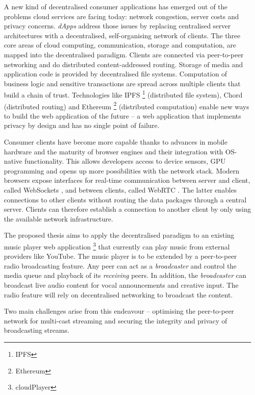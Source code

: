 A new kind of decentralised consumer applications has emerged out of the problems cloud services are facing today: network congestion,
server costs and privacy concerns. \textit{dApps} address those issues by replacing centralised server architectures with a decentralised, self-organising network of clients. The three core areas of cloud computing, communication, storage and computation, are mapped into the decentralised paradigm. Clients are connected via peer-to-peer networking and do distributed content-addressed routing. Storage of media and application code is provided by decentralised file systems. Computation of business logic and sensitive transactions are spread across multiple clients that build a chain of trust. Technologies like IPFS \footnote{IPFS} (distributed file system), Chord \cite{chord} (distributed routing) and Ethereum \footnote{Ethereum} (distributed computation) enable new ways to build the web application of the future – a web application that implements privacy by design and has no single point of failure.

Consumer clients have become more capable thanks to advances in mobile hardware and the maturity of browser engines and their integration with OS-native functionality. This allows developers access to device sensors, GPU programming and opens up more possibilities with the network stack. Modern browsers expose interfaces for real-time communication between server and client, called WebSockets \cite{rfc6455}, and between clients, called WebRTC \cite{webrtc-w3c}. The latter enables connections to other clients without routing the data packages through a central server. Clients can therefore establish a connection to another client by only using the available network infrastructure.

The proposed thesis aims to apply the decentralised paradigm to an existing music player web application \footnote{cloudPlayer} that currently can play music from external providers like YouTube. The music player is to be extended by a peer-to-peer radio broadcasting feature. Any peer can act as a \textit{broadcaster} and control the media queue and playback of its \textit{receiving} peers. In addition, the \textit{broadcaster} can broadcast live audio content for vocal announcements and creative input. The radio feature will rely on decentralised networking to broadcast the content.

Two main challenges arise from this endeavour – optimising the peer-to-peer network for multi-cast streaming and securing the integrity and privacy of broadcasting streams.
